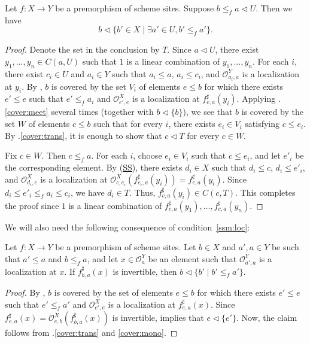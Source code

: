\documentclass[reqno]{amsart}
\newcommand{\axref}[1]{(\hyperref[ax:#1]{#1})}
\theoremstyle{definition}
\theoremstyle{remark}
\numberwithin{figure}{section}
\newcommand{\cover}{\triangleleft}
\begin{document}
\begin{lem}
Let $f : X \to Y$ be a premorphism of scheme sites.
Suppose $b \leq_f a \cover U$.
Then we have
\[ b \cover \{ b' \in X \mid \exists a' \in U, b' \leq_f a' \}. \]
\end{lem}
\begin{proof}
Denote the set in the conclusion by $T$.
Since $a \cover U$, there exist $y_1, \ldots, y_n \in C(a,U)$ such that $1$ is a linear combination of $y_1, \ldots, y_n$.
For each $i$, there exist $c_i \in U$ and $a_i \in Y$ such that $a_i \leq a$, $a_i \leq c_i$, and $\mathcal{O}^Y_{a_i,a}$ is a localization at $y_i$.
By , $b$ is covered by the set $V_i$ of elements $e \leq b$ for which there exists $e' \leq e$ such that $e' \leq_f a_i$ and $\mathcal{O}^X_{e',e}$ is a localization at $f^\sharp_{e,a}(y_i)$.
Applying .\eqref{cover:meet} several times (together with $b \cover \{ b \}$), we see that $b$ is covered by the set $W$ of elements $c \leq b$ such that for every $i$, there exists $e_i \in V_i$ satisfying $c \leq e_i$.
By .\eqref{cover:trans}, it is enough to show that $c \cover T$ for every $c \in W$.

Fix $c \in W$. Then $c \leq_f a$.
For each $i$, choose $e_i \in V_i$ such that $c \leq e_i$, and let $e'_i$ be the corresponding element.
By \axref{SS}, there exists $d_i \in X$ such that $d_i \leq c$, $d_i \leq e'_i$, and $\mathcal{O}^X_{d_i,c}$ is a localization at $\mathcal{O}^X_{c,e_i}(f^\sharp_{e_i,a}(y_i)) = f^\sharp_{c,a}(y_i)$.
Since $d_i \leq e'_i \leq_f a_i \leq c_i$, we have $d_i \in T$.
Thus, $f^\sharp_{c,a}(y_i) \in C(c,T)$.
This completes the proof since $1$ is a linear combination of $f^\sharp_{c,a}(y_1), \ldots, f^\sharp_{c,a}(y_n)$.
\end{proof}

We will also need the following consequence of condition~\eqref{ssm:loc}:

\begin{lem}[restrict]
Let $f : X \to Y$ be a premorphism of scheme sites.
Let $b \in X$ and $a',a \in Y$ be such that $a' \leq a$ and $b \leq_f a$, and let $x \in \mathcal{O}^Y_a$ be an element such that $\mathcal{O}^Y_{a',a}$ is a localization at $x$.
If $f^\sharp_{b,a}(x)$ is invertible, then $b \cover \{ b' \mid b' \leq_f a' \}$.
\end{lem}
\begin{proof}
By , $b$ is covered by the set of elements $e \leq b$ for which there exists $e' \leq e$ such that $e' \leq_f a'$ and $\mathcal{O}^X_{e',e}$ is a localization at $f^\sharp_{e,a}(x)$.
Since $f^\sharp_{e,a}(x) = \mathcal{O}^X_{e,b}(f^\sharp_{b,a}(x))$ is invertible,  implies that $e \cover \{ e' \}$.
Now, the claim follows from .\eqref{cover:trans} and \eqref{cover:mono}.
\end{proof}
\end{document}
